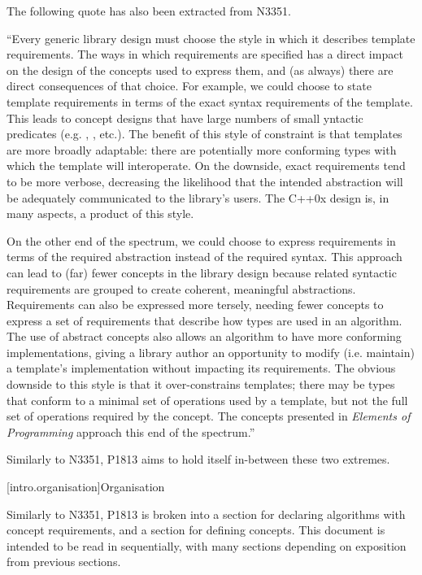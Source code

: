 The following quote has also been extracted from N3351.

``Every generic library design must choose the style in which it describes template requirements.
The ways in which requirements are specified has a direct impact on the design of the concepts
used to express them, and (as always) there are direct consequences of that choice. For example,
we could choose to state template requirements in terms of the exact syntax requirements of the
template. This leads to concept designs that have large numbers of small yntactic predicates (e.g.
, , etc.). The benefit of this style of constraint is that templates
are more broadly adaptable: there are potentially more conforming types with which the template will
interoperate. On the downside, exact requirements tend to be more verbose, decreasing the
likelihood that the intended abstraction will be adequately communicated to the library’s users.
The C++0x design is, in many aspects, a product of this style.

On the other end of the spectrum, we could choose to express requirements in terms of the required
abstraction instead of the required syntax. This approach can lead to (far) fewer concepts in the
library design because related syntactic requirements are grouped to create coherent, meaningful
abstractions. Requirements can also be expressed more tersely, needing fewer concepts to express a
set of requirements that describe how types are used in an algorithm. The use of abstract concepts
also allows an algorithm to have more conforming implementations, giving a library author an
opportunity to modify (i.e. maintain) a template’s implementation without impacting its
requirements. The obvious downside to this style is that it over-constrains templates; there may
be types that conform to a minimal set of operations used by a template, but not the full set of
operations required by the concept. The concepts presented in \textit{Elements of Programming}
approach this end of the spectrum.''

Similarly to N3351, P1813 aims to hold itself in-between these two extremes.

[intro.organisation]{Organisation}

Similarly to N3351, P1813 is broken into a section for declaring algorithms with concept
requirements, and a section for defining concepts. This document is intended to be read in
sequentially, with many sections depending on exposition from previous sections.

